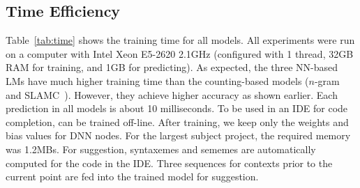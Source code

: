  \subsection{Time Efficiency}



Table~\ref{tab:time} shows the training time for all models.  All
experiments were run on a computer with Intel Xeon E5-2620 2.1GHz
(configured with 1 thread, 32GB RAM for training, and 1GB for
predicting). As expected, the three NN-based LMs have much higher
training time than the counting-based models ($n$-gram and
SLAMC~\cite{fse13}). However, they achieve higher accuracy as
shown earlier. Each prediction in all models is about 10
milliseconds.
%
To be used in an IDE for code completion, {\tool} can be trained
off-line. After training, we keep only the weights and bias values for
DNN nodes. For the largest subject project, the required memory was
1.2MBs. For suggestion, syntaxemes and sememes are automatically
computed for the code in the IDE. Three sequences for contexts prior
to the current point are fed into the trained model for suggestion.




